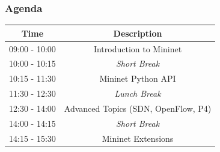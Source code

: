 \documentclass{beamer}
\begin{document}
\begin{frame}
  \frametitle{Agenda}

  \centering
  \begin{tabular}{cc}
    \hline
    \rowcolor{LightBlue}
    Time & \multicolumn{1}{c}{Description}\\ \hline
    09:00 - 10:00 & Introduction to Mininet \\ \hline
    10:00 - 10:15 & \textit{Short Break} \\ \hline
    10:15 - 11:30 & Mininet Python API \\ \hline
    11:30 - 12:30 & \textit{Lunch Break} \\ \hline
    12:30 - 14:00 & Advanced Topics (SDN, OpenFlow, P4) \\ \hline
    14:00 - 14:15 & \textit{Short Break} \\ \hline
    14:15 - 15:30 & Mininet Extensions \\ \hline
  \end{tabular}

\end{frame}
\end{document}
